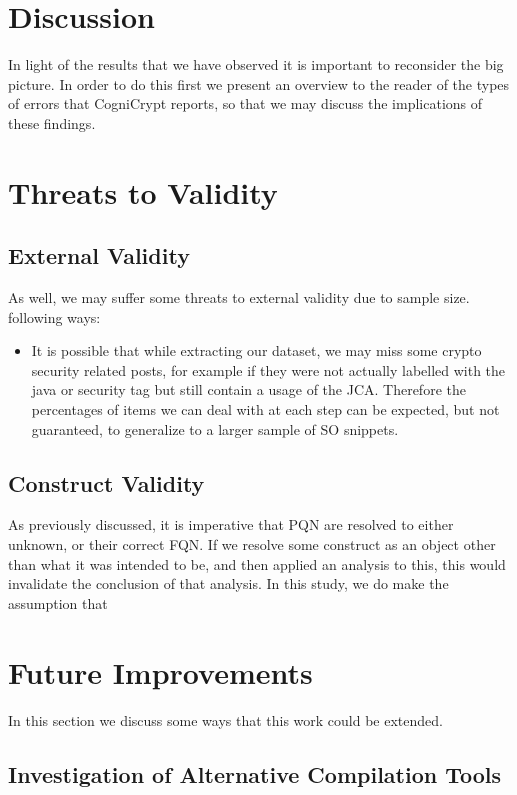 \documentclass[10pt, conference]{IEEEtran}
\begin{document}
\section{Discussion}

In light of the results that we have observed it is important to reconsider the big picture. In order to do this first we present an overview to the reader of the types of errors that CogniCrypt reports, so that we may discuss the implications of these findings.

\section{Threats to Validity}

\subsection{External Validity}
As well, we may suffer some threats to external validity due to sample size.  following ways:

\begin{itemize}
\item
It is possible that while extracting our dataset, we may miss some crypto security related posts, for example if they were not actually labelled with the java or security tag but still contain a usage of the JCA. Therefore the percentages of items we can deal with at each step can be expected, but not guaranteed, to generalize to a larger sample of SO snippets.

\end{itemize}

\subsection{Construct Validity}
As previously discussed, it is imperative that PQN are resolved to either unknown, or their correct FQN. If we resolve some construct as an object other than what it was intended to be, and then applied an analysis to this, this would invalidate the conclusion of that analysis. In this study, we do make the assumption that 


\section{Future Improvements}
 
In this section we discuss some ways that this work could be extended.

\subsection{Investigation of Alternative Compilation Tools}
\end{document}
